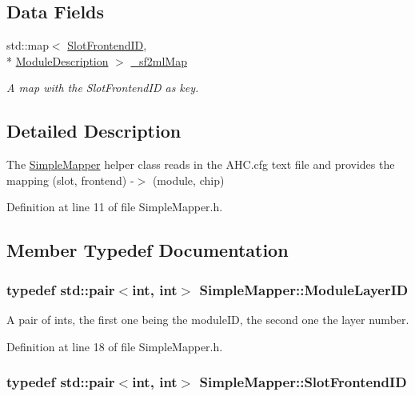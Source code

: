\subsection*{Data Fields}
\begin{DoxyCompactItemize}
\item 
std\-::map$<$ \hyperlink{class_simple_mapper_a2b973730223591df7c876a6dfbb922a0}{Slot\-Frontend\-I\-D}, \\*
\hyperlink{struct_simple_mapper_1_1_module_description}{Module\-Description} $>$ \hyperlink{class_simple_mapper_abc72184f9c3735233e2d21ef36161699}{\-\_\-sf2ml\-Map}
\begin{DoxyCompactList}\small\item\em A map with the Slot\-Frontend\-I\-D as key. \end{DoxyCompactList}\end{DoxyCompactItemize}


\subsection{Detailed Description}
The \hyperlink{class_simple_mapper}{Simple\-Mapper} helper class reads in the A\-H\-C.\-cfg text file and provides the mapping (slot, frontend) -\/$>$ (module, chip) 

Definition at line 11 of file Simple\-Mapper.\-h.



\subsection{Member Typedef Documentation}
\hypertarget{class_simple_mapper_a6fbef133414fb482f870ab56e7237682}{
\subsubsection[{Module\-Layer\-I\-D}]{\setlength{\rightskip}{0pt plus 5cm}typedef std\-::pair$<$int, int$>$ {\bf Simple\-Mapper\-::\-Module\-Layer\-I\-D}}}\label{class_simple_mapper_a6fbef133414fb482f870ab56e7237682}


A pair of ints, the first one being the module\-I\-D, the second one the layer number. 



Definition at line 18 of file Simple\-Mapper.\-h.

\hypertarget{class_simple_mapper_a2b973730223591df7c876a6dfbb922a0}{
\subsubsection[{Slot\-Frontend\-I\-D}]{\setlength{\rightskip}{0pt plus 5cm}typedef std\-::pair$<$int, int$>$ {\bf Simple\-Mapper\-::\-Slot\-Frontend\-I\-D}}}\label{class_simple_mapper_a2b973730223591df7c876a6dfbb922a0}


